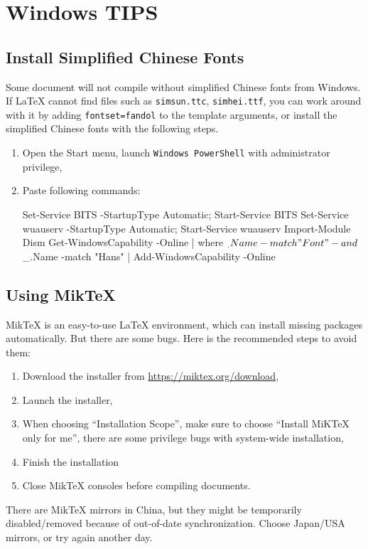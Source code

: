\chapter{Windows TIPS}\label{chap:win}

\section{Install Simplified Chinese Fonts}

Some document will not compile without simplified Chinese fonts from Windows.
If \LaTeX{} cannot find files such as \verb|simsun.ttc|, \verb|simhei.ttf|,
you can work around with it by adding \verb|fontset=fandol| to the template arguments,
or install the simplified Chinese fonts with the following steps.

\begin{enumerate}
\item Open the Start menu, launch \verb|Windows PowerShell| with administrator privilege,
\item Paste following commands:
\begin{shell}
Set-Service BITS -StartupType Automatic; Start-Service BITS
Set-Service wuauserv -StartupType Automatic; Start-Service wuauserv
Import-Module Dism
Get-WindowsCapability -Online | where { $_.Name -match "Font" -and $_.Name -match "Hans" } | Add-WindowsCapability -Online
\end{shell}
\end{enumerate}

\section{Using Mik\TeX}

Mik\TeX{} is an easy-to-use \LaTeX{} environment, which can install missing packages automatically.
But there are some bugs. Here is the recommended steps to avoid them:
\begin{enumerate}
\item Download the installer from \url{https://miktex.org/download},
\item Launch the installer,
\item When choosing ``Installation Scope'', make sure to choose ``Install MiKTeX only for me'',
there are some privilege bugs with system-wide installation,
\item Finish the installation
\item Close MikTeX consoles before compiling documents.
\end{enumerate}

There are MikTeX mirrors in China,
but they might be temporarily disabled/removed because of out-of-date synchronization.
Choose Japan/USA mirrors, or try again another day.
